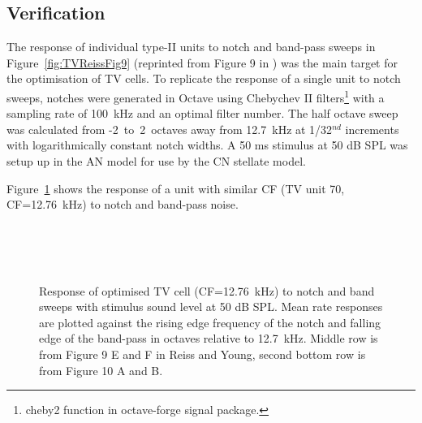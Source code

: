 \subsection{Verification}

The response of individual type-II units to notch and band-pass sweeps in
Figure~\ref{fig:TVReissFig9} (reprinted from Figure 9 in
\citep*{ReissYoung:2005}) was the main target for the optimisation of TV cells.
To replicate the response of a single unit to notch sweeps, notches were
generated in Octave using Chebychev II filters\footnote{\textsf{cheby2} function
  in octave-forge signal package.}  with a sampling rate of 100~kHz and an
optimal filter number.  The half octave sweep was calculated from
-2~to~2~octaves away from 12.7~kHz at 1/32$^{nd}$ increments with
logarithmically constant notch widths\footnotemark. A 50 ms stimulus at 50 dB
SPL was setup up in the AN model for use by the CN stellate model.



\smallskip{} 


Figure~\ref{fig:TV_SweepUnit70} shows the response of a unit with similar CF (TV
unit 70, CF=12.76~kHz) to notch and band-pass noise. 

\begin{figure}[h!]
  \centering
  \\
  \\
  \\
  \caption{Response of optimised TV cell (CF=12.76~kHz) to notch and band sweeps with stimulus sound level at 50 dB SPL\@. Mean rate responses are plotted against the rising edge frequency of the notch and falling edge of the band-pass in octaves relative to 12.7~kHz. Middle row is from Figure 9 E and F in Reiss and Young, second bottom row is from Figure 10 A and B. }
  \label{fig:TV_SweepUnit70}
\end{figure}



